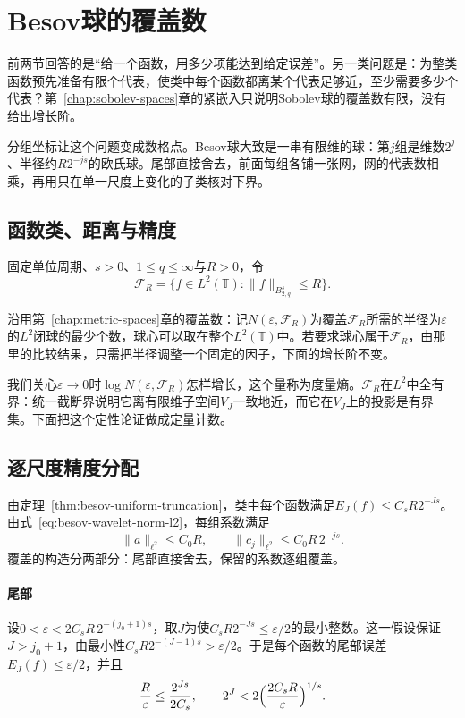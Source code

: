 \section{Besov球的覆盖数}
\label{sec:besov-covering}

前两节回答的是“给一个函数，用多少项能达到给定误差”。另一类问题是：为整类函数预先准备有限个代表，使类中每个函数都离某个代表足够近，至少需要多少个代表？第~\ref{chap:sobolev-spaces}章的紧嵌入只说明Sobolev球的覆盖数有限，没有给出增长阶。

分组坐标让这个问题变成数格点。Besov球大致是一串有限维的球：第$j$组是维数$2^j$、半径约$R2^{-js}$的欧氏球。尾部直接舍去，前面每组各铺一张网，网的代表数相乘，再用只在单一尺度上变化的子类核对下界。

\subsection{函数类、距离与精度}
\label{sec:besov-cover-setting}

固定单位周期、$s>0$、$1\leq q\leq\infty$与$R>0$，令
\[
 \mathcal F_R=\{f\in L^2(\mathbb T):\lVert f\rVert_{B^s_{2,q}}\leq R\}.
\]

沿用第~\ref{chap:metric-spaces}章的覆盖数：记$N(\varepsilon,\mathcal F_R)$为覆盖$\mathcal F_R$所需的半径为$\varepsilon$的$L^2$闭球的最少个数，球心可以取在整个$L^2(\mathbb T)$中。若要求球心属于$\mathcal F_R$，由那里的比较结果，只需把半径调整一个固定的因子，下面的增长阶不变。

我们关心$\varepsilon\to0$时$\log N(\varepsilon,\mathcal F_R)$怎样增长，这个量称为度量熵。$\mathcal F_R$在$L^2$中全有界：统一截断界说明它离有限维子空间$V_J$一致地近，而它在$V_J$上的投影是有界集。下面把这个定性论证做成定量计数。

\subsection{逐尺度精度分配}
\label{sec:besov-precision-allocation}

由定理~\ref{thm:besov-uniform-truncation}，类中每个函数满足$E_J(f)\leq C_sR2^{-Js}$。由式~\eqref{eq:besov-wavelet-norm-l2}，每组系数满足
\[
 \lVert a\rVert_{\ell^2}\leq C_0R,\qquad\lVert c_j\rVert_{\ell^2}\leq C_0R\,2^{-js}.
\]
覆盖的构造分两部分：尾部直接舍去，保留的系数逐组覆盖。

\paragraph{尾部}
设$0<\varepsilon<2C_sR\,2^{-(j_0+1)s}$，取$J$为使$C_sR2^{-Js}\leq\varepsilon/2$的最小整数。这一假设保证$J>j_0+1$，由最小性$C_sR2^{-(J-1)s}>\varepsilon/2$。于是每个函数的尾部误差$E_J(f)\leq\varepsilon/2$，并且
\begin{equation}
 \frac{R}{\varepsilon}\leq\frac{2^{Js}}{2C_s},\qquad2^J<2\Bigl(\frac{2C_sR}{\varepsilon}\Bigr)^{1/s}.
 \label{eq:besov-cover-scale}
\end{equation}

